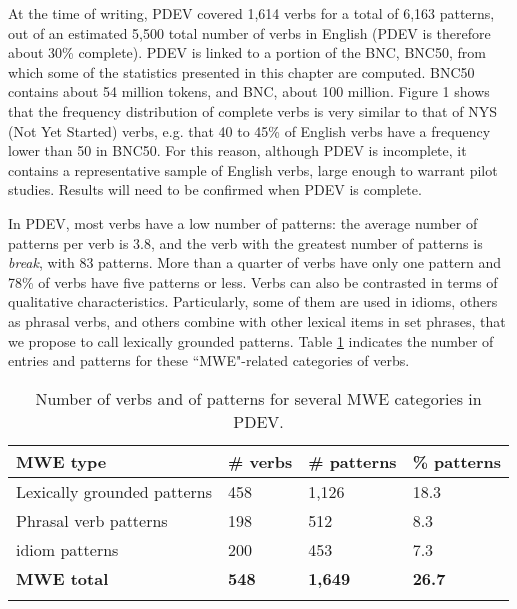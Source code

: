 \documentclass[output=paper]{langsci/langscibook}
\begin{document}
At the time of writing, PDEV covered 1,614 verbs for a total of 6,163
patterns, out of an estimated 5,500 total number of verbs in English
(PDEV is therefore about 30\% complete). PDEV is linked to a portion of
the BNC, BNC50, from which some of the statistics presented in this
chapter are computed. BNC50 contains about 54 million tokens, and BNC,
about 100 million. Figure 1 shows that the frequency distribution of
complete verbs is very similar to that of NYS (Not Yet Started) verbs,
e.g. that 40 to 45\% of English verbs have a frequency lower than 50 in
BNC50. For this reason, although PDEV is incomplete, it contains a
representative sample of English verbs, large enough to warrant pilot
studies. Results will need to be confirmed when PDEV is complete.



In PDEV, most verbs have a low number of patterns: the average number of
patterns per verb is 3.8, and the verb with the greatest number of
patterns is \textit{break}, with 83 patterns. More than a
quarter of verbs have only one pattern and 78\% of verbs have five
patterns or less. Verbs can also be contrasted in terms of qualitative
characteristics. Particularly, some of them are used in idioms, others
as phrasal verbs, and others combine with other lexical items in set
phrases, that we propose to call lexically grounded patterns. Table \ref{PDEVcat}
indicates the number of entries and patterns for these ``MWE"-related
categories of verbs.

\begin{table}
\begin{tabular}{llll}
\lsptoprule
\textbf{MWE type} & \textbf{\# verbs} & \# \textbf{patterns} & \textbf{\% patterns}\\
\midrule
Lexically grounded patterns & 458 & 1,126 & 18.3 \\
Phrasal verb patterns & 198 & 512 & 8.3 \\
idiom patterns & 200 & 453 & 7.3 \\
\textbf{MWE total} & \textbf{548} & \textbf{1,649} & \textbf{26.7} \\
\lspbottomrule
\end{tabular}
\caption{Number of verbs and of patterns for several MWE categories in PDEV.}
\label{PDEVcat}
\end{table}
\end{document}
